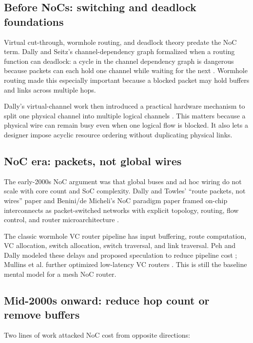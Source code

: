 \documentclass[11pt]{article}
\begin{document}
\subsection{Before NoCs: switching and deadlock foundations}

Virtual cut-through, wormhole routing, and deadlock theory predate the NoC term. Dally and Seitz's channel-dependency graph formalized when a routing function can deadlock: a cycle in the channel dependency graph is dangerous because packets can each hold one channel while waiting for the next \cite{DallySeitz1987DeadlockFree}. Wormhole routing made this especially important because a blocked packet may hold buffers and links across multiple hops.

Dally's virtual-channel work then introduced a practical hardware mechanism to split one physical channel into multiple logical channels \cite{Dally1990VC,Dally1992VC}. This matters because a physical wire can remain busy even when one logical flow is blocked. It also lets a designer impose acyclic resource ordering without duplicating physical links.

\subsection{NoC era: packets, not global wires}

The early-2000s NoC argument was that global buses and ad hoc wiring do not scale with core count and SoC complexity. Dally and Towles' ``route packets, not wires'' paper and Benini/de Micheli's NoC paradigm paper framed on-chip interconnects as packet-switched networks with explicit topology, routing, flow control, and router microarchitecture \cite{DallyTowles2001,BeniniDeMicheli2002}.

The classic wormhole VC router pipeline has input buffering, route computation, VC allocation, switch allocation, switch traversal, and link traversal. Peh and Dally modeled these delays and proposed speculation to reduce pipeline cost \cite{PehDally2001}; Mullins et al. further optimized low-latency VC routers \cite{Mullins2004}. This is still the baseline mental model for a mesh NoC router.

\subsection{Mid-2000s onward: reduce hop count or remove buffers}

Two lines of work attacked NoC cost from opposite directions:
\end{document}
